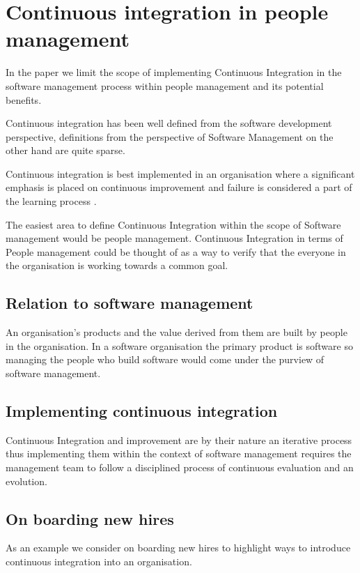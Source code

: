 \documentclass[12pt,conference]{IEEEtran}
\begin{document}
\section*{Continuous integration in people management}

In the paper we limit the scope of implementing Continuous Integration in the software management process within people management and its potential benefits.

Continuous integration has been well defined from the software development perspective, definitions from the perspective of Software Management on the other hand are quite sparse. 

Continuous integration is best implemented in an organisation where a significant emphasis is placed on continuous improvement and failure is considered a part of the learning process \cite{edmondson_strategies_2011}.

The easiest area to define Continuous Integration within the scope of Software management would be people management. Continuous Integration in terms of People management could be thought of as a way to verify that the everyone in the organisation is working towards a common goal.


\subsection*{Relation to software management}

An organisation's products and the value derived from them are built by people in the organisation. In a software organisation the primary product is software so managing the people who build software would come under the purview of software management. 

\subsection*{Implementing continuous integration}

Continuous Integration and improvement are by their nature an iterative process thus implementing them within the context of software management requires the management team to follow a disciplined process of continuous evaluation and an evolution.

\subsection*{On boarding new hires}

As an example we consider on boarding new hires to highlight ways to introduce continuous integration into an organisation.
\end{document}
